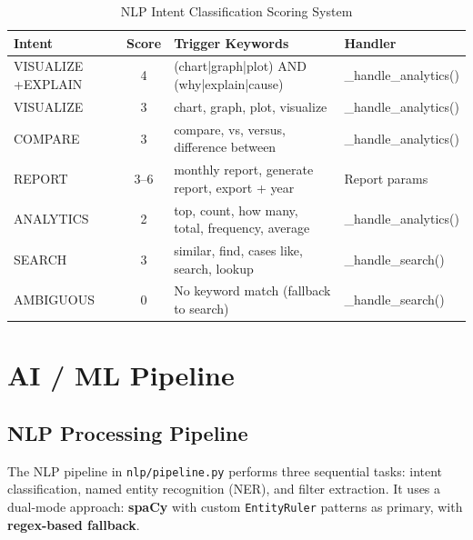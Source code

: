 \documentclass[12pt, a4paper, twoside]{article}
\begin{document}
\begin{table}[H]
\centering
\caption{NLP Intent Classification Scoring System}
\label{tab:intents}
\begin{tabularx}{\textwidth}{L{2.5cm} c L{5cm} L{2.8cm}}
\toprule
{}\color{white}\textbf{Intent} & \color{white}\textbf{Score} & \color{white}\textbf{Trigger Keywords} & \color{white}\textbf{Handler} \\
\midrule
VISUALIZE +EXPLAIN & 4 & (chart|graph|plot) AND (why|explain|cause) & \_handle\_analytics() \\
VISUALIZE & 3 & chart, graph, plot, visualize & \_handle\_analytics() \\
COMPARE & 3 & compare, vs, versus, difference between & \_handle\_analytics() \\
REPORT & 3--6 & monthly report, generate report, export + year & Report params \\
ANALYTICS & 2 & top, count, how many, total, frequency, average & \_handle\_analytics() \\
SEARCH & 3 & similar, find, cases like, search, lookup & \_handle\_search() \\
AMBIGUOUS & 0 & No keyword match (fallback to search) & \_handle\_search() \\
\bottomrule
\end{tabularx}
\end{table}

\newpage

\section{AI / ML Pipeline}

\subsection{NLP Processing Pipeline}

The NLP pipeline in \texttt{nlp/pipeline.py} performs three sequential tasks: intent classification, named entity recognition (NER), and filter extraction. It uses a dual-mode approach: \textbf{spaCy} with custom \texttt{EntityRuler} patterns as primary, with \textbf{regex-based fallback}.
\end{document}
